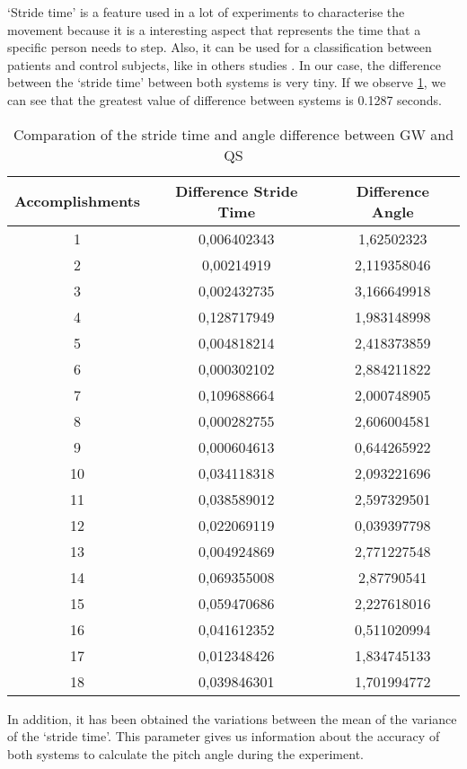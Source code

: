 ‘Stride time’ is a feature used in a lot of experiments to characterise the movement because it is a interesting aspect that represents the time that a specific person needs to step. Also, it can be used for a classification between patients and control subjects, like in others studies \cite{Hausdorff}.
In our case, the difference between  the ‘stride time’ between both systems is very tiny. If we observe \ref{tab:Stride_time}, we can see that the greatest value of difference between systems is 0.1287 seconds.

\begin{table}[h]
	\caption{Comparation of the stride time and angle difference between GW and QS}	
	\centering
	\begin{tabular}{|c|c|c|}\hline
		
		Accomplishments & Difference Stride Time	& Difference Angle	 	\\ \hline
		1  & 0,006402343	 & 1,62502323 \\
		2 & 0,00214919	& 2,119358046 \\
		3 & 0,002432735	& 3,166649918 \\
		4 & 0,128717949	& 1,983148998 \\
		5 & 0,004818214	& 2,418373859 \\
		6 & 0,000302102	& 2,884211822 \\
		7 & 0,109688664	& 2,000748905 \\
		8 & 0,000282755	& 2,606004581 \\
		9 & 0,000604613	 & 0,644265922 \\
		10 & 0,034118318	& 2,093221696 \\
		11 & 0,038589012	& 2,597329501 \\
		12 & 0,022069119	& 0,039397798 \\
		13 & 0,004924869	& 2,771227548 \\
		14 & 0,069355008	& 2,87790541 \\
		15 & 0,059470686	& 2,227618016 \\
		16 & 0,041612352	& 0,511020994 \\
		17 & 0,012348426	& 1,834745133 \\
		18 & 0,039846301	& 1,701994772 
	\\ \hline
	\end{tabular}
	\label{tab:Stride_time}
	
\end{table}

In addition, it has been obtained the variations between the mean of the variance of the ‘stride time’. This parameter gives us information about the accuracy of both systems to calculate the pitch angle during the experiment.

